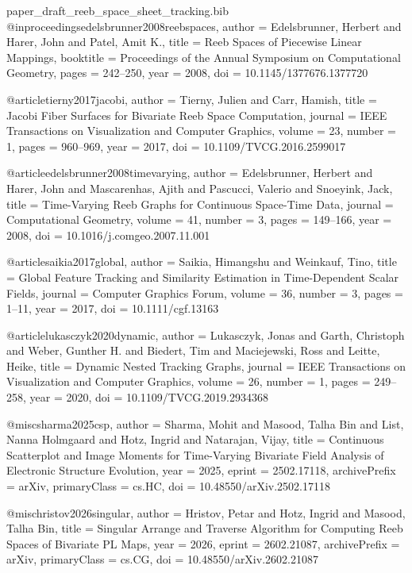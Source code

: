 \begin{filecontents*}{paper_draft_reeb_space_sheet_tracking.bib}
@inproceedings{edelsbrunner2008reebspaces,
  author = {Edelsbrunner, Herbert and Harer, John and Patel, Amit K.},
  title = {Reeb Spaces of Piecewise Linear Mappings},
  booktitle = {Proceedings of the Annual Symposium on Computational Geometry},
  pages = {242--250},
  year = {2008},
  doi = {10.1145/1377676.1377720}
}

@article{tierny2017jacobi,
  author = {Tierny, Julien and Carr, Hamish},
  title = {Jacobi Fiber Surfaces for Bivariate Reeb Space Computation},
  journal = {IEEE Transactions on Visualization and Computer Graphics},
  volume = {23},
  number = {1},
  pages = {960--969},
  year = {2017},
  doi = {10.1109/TVCG.2016.2599017}
}

@article{edelsbrunner2008timevarying,
  author = {Edelsbrunner, Herbert and Harer, John and Mascarenhas, Ajith and Pascucci, Valerio and Snoeyink, Jack},
  title = {Time-Varying Reeb Graphs for Continuous Space-Time Data},
  journal = {Computational Geometry},
  volume = {41},
  number = {3},
  pages = {149--166},
  year = {2008},
  doi = {10.1016/j.comgeo.2007.11.001}
}

@article{saikia2017global,
  author = {Saikia, Himangshu and Weinkauf, Tino},
  title = {Global Feature Tracking and Similarity Estimation in Time-Dependent Scalar Fields},
  journal = {Computer Graphics Forum},
  volume = {36},
  number = {3},
  pages = {1--11},
  year = {2017},
  doi = {10.1111/cgf.13163}
}

@article{lukasczyk2020dynamic,
  author = {Lukasczyk, Jonas and Garth, Christoph and Weber, Gunther H. and Biedert, Tim and Maciejewski, Ross and Leitte, Heike},
  title = {Dynamic Nested Tracking Graphs},
  journal = {IEEE Transactions on Visualization and Computer Graphics},
  volume = {26},
  number = {1},
  pages = {249--258},
  year = {2020},
  doi = {10.1109/TVCG.2019.2934368}
}

@misc{sharma2025csp,
  author = {Sharma, Mohit and Masood, Talha Bin and List, Nanna Holmgaard and Hotz, Ingrid and Natarajan, Vijay},
  title = {Continuous Scatterplot and Image Moments for Time-Varying Bivariate Field Analysis of Electronic Structure Evolution},
  year = {2025},
  eprint = {2502.17118},
  archivePrefix = {arXiv},
  primaryClass = {cs.HC},
  doi = {10.48550/arXiv.2502.17118}
}

@misc{hristov2026singular,
  author = {Hristov, Petar and Hotz, Ingrid and Masood, Talha Bin},
  title = {Singular Arrange and Traverse Algorithm for Computing Reeb Spaces of Bivariate PL Maps},
  year = {2026},
  eprint = {2602.21087},
  archivePrefix = {arXiv},
  primaryClass = {cs.CG},
  doi = {10.48550/arXiv.2602.21087}
}
\end{filecontents*}

